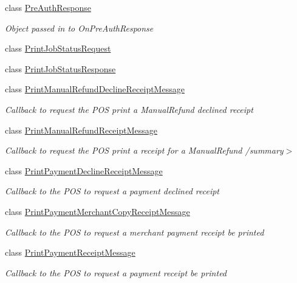 \begin{DoxyCompactItemize}
class \hyperlink{classcom_1_1clover_1_1remotepay_1_1sdk_1_1_pre_auth_response}{Pre\+Auth\+Response}
\begin{DoxyCompactList}\small\item\em Object passed in to On\+Pre\+Auth\+Response \end{DoxyCompactList}\item 
class \hyperlink{classcom_1_1clover_1_1remotepay_1_1sdk_1_1_print_job_status_request}{Print\+Job\+Status\+Request}
\item 
class \hyperlink{classcom_1_1clover_1_1remotepay_1_1sdk_1_1_print_job_status_response}{Print\+Job\+Status\+Response}
\item 
class \hyperlink{classcom_1_1clover_1_1remotepay_1_1sdk_1_1_print_manual_refund_decline_receipt_message}{Print\+Manual\+Refund\+Decline\+Receipt\+Message}
\begin{DoxyCompactList}\small\item\em Callback to request the P\+OS print a Manual\+Refund declined receipt \end{DoxyCompactList}\item 
class \hyperlink{classcom_1_1clover_1_1remotepay_1_1sdk_1_1_print_manual_refund_receipt_message}{Print\+Manual\+Refund\+Receipt\+Message}
\begin{DoxyCompactList}\small\item\em Callback to request the P\+OS print a receipt for a Manual\+Refund /summary$>$ \end{DoxyCompactList}\item 
class \hyperlink{classcom_1_1clover_1_1remotepay_1_1sdk_1_1_print_payment_decline_receipt_message}{Print\+Payment\+Decline\+Receipt\+Message}
\begin{DoxyCompactList}\small\item\em Callback to the P\+OS to request a payment declined receipt \end{DoxyCompactList}\item 
class \hyperlink{classcom_1_1clover_1_1remotepay_1_1sdk_1_1_print_payment_merchant_copy_receipt_message}{Print\+Payment\+Merchant\+Copy\+Receipt\+Message}
\begin{DoxyCompactList}\small\item\em Callback to the P\+OS to request a merchant payment receipt be printed \end{DoxyCompactList}\item 
class \hyperlink{classcom_1_1clover_1_1remotepay_1_1sdk_1_1_print_payment_receipt_message}{Print\+Payment\+Receipt\+Message}
\begin{DoxyCompactList}\small\item\em Callback to the P\+OS to request a payment receipt be printed \end{DoxyCompactList}\item 

\end{DoxyCompactItemize}
